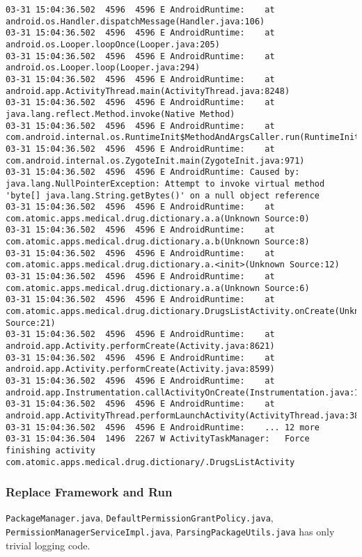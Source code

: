 \begin{lstlisting}
03-31 15:04:36.502  4596  4596 E AndroidRuntime: 	at android.os.Handler.dispatchMessage(Handler.java:106)
03-31 15:04:36.502  4596  4596 E AndroidRuntime: 	at android.os.Looper.loopOnce(Looper.java:205)
03-31 15:04:36.502  4596  4596 E AndroidRuntime: 	at android.os.Looper.loop(Looper.java:294)
03-31 15:04:36.502  4596  4596 E AndroidRuntime: 	at android.app.ActivityThread.main(ActivityThread.java:8248)
03-31 15:04:36.502  4596  4596 E AndroidRuntime: 	at java.lang.reflect.Method.invoke(Native Method)
03-31 15:04:36.502  4596  4596 E AndroidRuntime: 	at com.android.internal.os.RuntimeInit$MethodAndArgsCaller.run(RuntimeInit.java:552)
03-31 15:04:36.502  4596  4596 E AndroidRuntime: 	at com.android.internal.os.ZygoteInit.main(ZygoteInit.java:971)
03-31 15:04:36.502  4596  4596 E AndroidRuntime: Caused by: java.lang.NullPointerException: Attempt to invoke virtual method 'byte[] java.lang.String.getBytes()' on a null object reference
03-31 15:04:36.502  4596  4596 E AndroidRuntime: 	at com.atomic.apps.medical.drug.dictionary.a.a(Unknown Source:0)
03-31 15:04:36.502  4596  4596 E AndroidRuntime: 	at com.atomic.apps.medical.drug.dictionary.a.b(Unknown Source:8)
03-31 15:04:36.502  4596  4596 E AndroidRuntime: 	at com.atomic.apps.medical.drug.dictionary.a.<init>(Unknown Source:12)
03-31 15:04:36.502  4596  4596 E AndroidRuntime: 	at com.atomic.apps.medical.drug.dictionary.a.a(Unknown Source:6)
03-31 15:04:36.502  4596  4596 E AndroidRuntime: 	at com.atomic.apps.medical.drug.dictionary.DrugsListActivity.onCreate(Unknown Source:21)
03-31 15:04:36.502  4596  4596 E AndroidRuntime: 	at android.app.Activity.performCreate(Activity.java:8621)
03-31 15:04:36.502  4596  4596 E AndroidRuntime: 	at android.app.Activity.performCreate(Activity.java:8599)
03-31 15:04:36.502  4596  4596 E AndroidRuntime: 	at android.app.Instrumentation.callActivityOnCreate(Instrumentation.java:1456)
03-31 15:04:36.502  4596  4596 E AndroidRuntime: 	at android.app.ActivityThread.performLaunchActivity(ActivityThread.java:3804)
03-31 15:04:36.502  4596  4596 E AndroidRuntime: 	... 12 more
03-31 15:04:36.504  1496  2267 W ActivityTaskManager:   Force finishing activity com.atomic.apps.medical.drug.dictionary/.DrugsListActivity
\end{lstlisting}

\subsubsection{Replace Framework and Run}

\texttt{PackageManager.java}, \texttt{DefaultPermissionGrantPolicy.java}, \texttt{PermissionManagerServiceImpl.java}, \texttt{ParsingPackageUtils.java} has only trivial logging code. 

